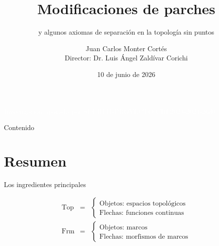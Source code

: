 \documentclass[compress,12pt]{beamer}
\title{Modificaciones de parches}
\subtitle{y algunos axiomas de separación en la topología sin puntos}
\date{10 de junio de 2026}
\author{Juan Carlos Monter Cortés \\ Director: Dr. Luis Ángel Zaldívar Corichi}
\DeclareMathOperator{\pt}{pt}
\DeclareMathOperator{\Frm}{Frm}
\DeclareMathOperator{\Top}{Top}
\begin{document}

\begin{frame}[plain]
\titlepage

\vfill
\begin{center}
    \textcolor{white}{\scriptsize Investigación apoyada por SECIHTI-PROYECTO CBF2023-2024-2630}
\end{center}
\end{frame}

\begin{frame}{Contenido}
\tableofcontents
\end{frame}

\section{Resumen}

\begin{frame}{Los ingredientes principales}

\small

\[
\begin{array}{rcl}
\Top & = &
\left\{
\begin{array}{l}
\text{Objetos: espacios topológicos} \\
\text{Flechas: funciones continuas}
\end{array}
\right. \\[0.6cm]
\Frm & = &
\left\{
\begin{array}{l}
\text{Objetos: marcos} \\
\text{Flechas: morfismos de marcos}
\end{array}
\right.
\end{array}
\]

\vspace{0.2cm}

\begin{center}
\end{center}
\end{frame}
\end{document}
